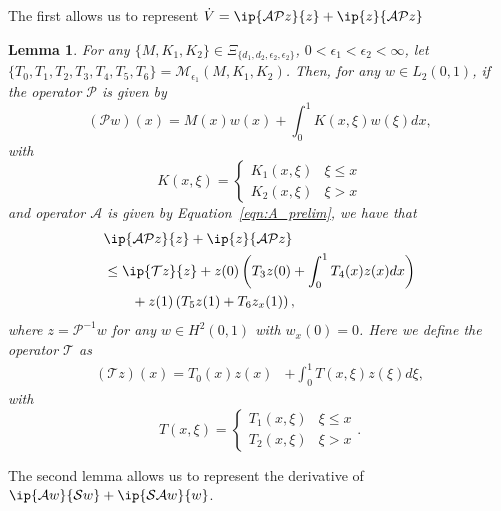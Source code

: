 \documentclass[US letter, 9 pt, conference]{ieeeconf}  \usepackage{setspace}
\newtheorem{lemma}{Lemma}
\newcommand{\igzo}{\int_0^1}
\newcommand{\lt}{L_2(0,1)}
\newcommand{\mcl}[1]{\mathcal{#1}}
\newcommand{\pop}{\mathcal{P}}
\newcommand{\pinv}{\mathcal{P}^{-1}}
\newcommand{\sop}{\mathcal{S}}
\begin{document}
 The first allows us to represent $\dot V=\ip{\mcl{AP}z}{z}+\ip{z}{\mcl{AP}z}$
\begin{lemma}\label{lem:dual_LOI}
For any $\{M,K_1,K_2\} \in \Xi_{\{d_1,d_2,\epsilon_2,\epsilon_2\}}$, $0<\epsilon_1<\epsilon_2<\infty$, let $\{T_0,T_1,T_2,T_3,T_4,T_5,T_6\}=\mcl{M}_{\epsilon_1}\left(M,K_1,K_2\right)$. Then, for any $w\in \lt$, if the operator $\pop$ is given by
\begin{equation}\label{eqn:pop}
\left(\pop w \right)(x)=M(x)w(x)+\igzo K(x,\xi)w(\xi)dx,
\end{equation} with
\[
K(x,\xi) = \begin{cases} K_1(x,\xi) & \xi \leq x \\
K_2(x,\xi) &  \xi>x \end{cases}
\] and operator $\mcl{A}$ is given by Equation~\eqref{eqn:A_prelim}, we have that
\begin{align*}
&\ip{\mcl{AP}z}{z}+\ip{z}{\mcl{AP}z} \\
&\leq \ip{\mcl{T}z}{z}+z(0)\left(T_3 z(0)+\igzo T_4(x)z(x)dx \right) \\
& \quad \quad +z(1) \left(T_5 z(1)+T_6 z_x(1) \right),
\end{align*}
where $z=\pinv w$ for any $w \in H^2(0,1)$ with $w_x(0)=0$. Here we define the operator $\mcl{T}$ as
\begin{align*}
\left(\mcl{T}z \right)(x)=T_0(x)z(x)&+\igzo T(x,\xi)z(\xi)d\xi,
\end{align*} with
\[T(x,\xi) = \begin{cases} T_1(x,\xi) & \xi \leq x \\ 
T_2(x,\xi) &  \xi>x \end{cases}.\]
\end{lemma}
The second lemma allows us to represent the derivative of $\ip{\mcl{A}w}{\sop w}+\ip{\mcl{SA}w}{w}$.
\end{document}
